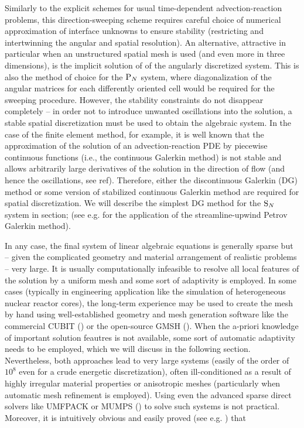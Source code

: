 Similarly to the explicit schemes for usual time-dependent advection-reaction problems, this direction-sweeping scheme
requires careful choice of numerical approximation of interface unknowns to ensure stability (restricting and
intertwinning the angular and spatial resolution). An alternative, attractive in particular when an unstructured
spatial mesh is used (and even more in three dimensions), is the implicit solution of of the angularly discretized
system. This is also the method of choice for the $\text{P}_{N}$ system, where diagonalization of the angular matrices for each
differently oriented cell would be required for the sweeping procedure. However, the stability constraints do not
disappear completely -- in order not to introduce unwanted oscillations into the solution, a stable spatial
discretization must be used to obtain the algebraic system. In the case of the finite element method, for example, it is
well known that the approximation of the solution of an advection-reaction PDE by piecewise continuous functions (i.e.,
the continuous Galerkin method) is not stable and allows arbitrarily large derivatives of the solution in the direction
of flow (and hence the oscillations, see \alert{ref}).
Therefore, either the discontinuous Galerkin (DG) method or some version of stabilized continuous Galerkin method are
required for spatial discretization. We will describe the simplest DG method for the $\text{S}_{N}$ system in \alert{section};
(see e.g.
\cite{Meinkohn} for the application of the streamline-upwind Petrov Galerkin method).

In any case, the final system of linear algebraic equations is generally sparse but -- given the complicated geometry
and material arrangement of realistic problems -- very large. It is usually computationally infeasible to resolve all
local features of the solution by a uniform mesh and some sort of adaptivity is employed. In some cases (typically in
engineering application like the simulation of heterogeneous nuclear reactor cores), the long-term experience may be
used to create the mesh by hand using well-established geometry and mesh generation software like the commercial CUBIT
(\cite{CUBIT}) or the open-source GMSH (\cite{GMSH}). When the a-priori knowledge of important solution feautres is not
available, some sort of automatic adaptivity needs to be employed, which we will discuss in the following section.
Nevertheless, both approaches lead to very large systems (easily of the order of $10^8$ even for a crude energetic
discretization), often ill-conditioned as a result of highly irregular material properties or anisotropic meshes
(particularly when automatic mesh refinement is employed). Using even the advanced sparse direct solvers like
UMFPACK or MUMPS (\cite{UMFPACK,MUMPS}) to solve such systems is not practical.
Moreover, it is intuitively obvious and easily proved (see e.g. \cite{Arioli}) that 

